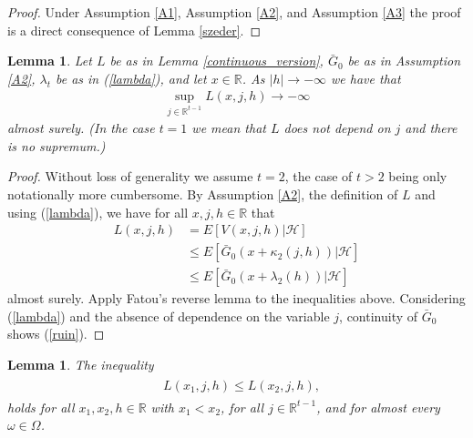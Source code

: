 \documentclass[a4paper]{article}
\newtheorem{lemma}[theorem]{Lemma}
\begin{document}
\begin{proof}
Under Assumption \ref{A1}, Assumption \ref{A2}, and Assumption \ref{A3} the proof is a direct consequence of Lemma \ref{szeder}.

\end{proof}

\begin{lemma}\label{lemma::infinite_loss}
Let $L$ be as in Lemma \ref{continuous_version}, $\bar G_0$ be as in Assumption \ref{A2}, 
$\lambda_t$ be as in (\ref{lambda}), and let $x \in \mathbb{R}$. As $|h| \to -\infty$ we have that
\begin{align}\label{ruin}
\sup_{j \in \mathbb{R}^{t-1}}L(x,j,h) \to -\infty
\end{align}
almost surely. (In the case $t=1$ we mean that $L$ does not depend on $j$ and there is no supremum.)
\end{lemma}
\begin{proof}
Without loss of generality we assume $t=2$, the case of $t>2$ being only notationally more cumbersome. 
By Assumption \ref{A2}, the definition of $L$ and using (\ref{lambda}), we have for all $x,j,h \in \mathbb{R}$ that
\begin{align*}
L(x,j,h) &= E[V(x,j,h) | \mathcal{H}]
\\ 
&\leq E[\bar G_0(x + \kappa_{2}(j,h))| \mathcal{H}]
\\
&
\leq 
E[\bar G_0(x + \lambda_{2}(h))| \mathcal{H}]
\end{align*}
almost surely. Apply Fatou's reverse lemma to the inequalities above. 
Considering (\ref{lambda}) and the absence of dependence on the variable $j$, continuity of $\bar G_0$ shows (\ref{ruin}).
\end{proof}

\begin{lemma}\label{lemma::monotonicity_}
The inequality
\begin{align}\label{pók}
\begin{split}
&L(x_1, j, h) \leq L(x_2, j, h),
\end{split}
\end{align}
holds for all $x_1,x_2, h \in  \mathbb{R}$ with $x_1 < x_2$, for all $j \in \mathbb{R}^{t-1}$, and for almost every $\omega \in \Omega$.
\end{lemma}
\end{document}
